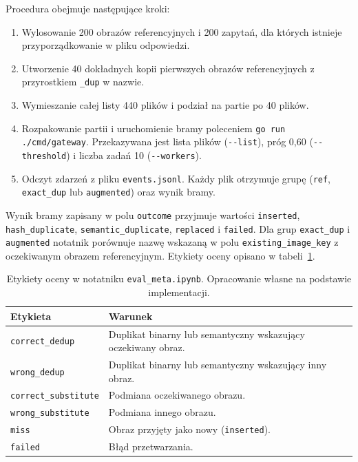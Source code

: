 Procedura obejmuje następujące kroki:

\begin{enumerate}
    \item Wylosowanie 200 obrazów referencyjnych i 200 zapytań,
    dla których istnieje przyporządkowanie w pliku odpowiedzi.
    \item Utworzenie 40 dokładnych kopii pierwszych obrazów
    referencyjnych z przyrostkiem \texttt{\_dup} w nazwie.
    \item Wymieszanie całej listy 440 plików i podział na partie
    po 40 plików.
    \item Rozpakowanie partii i uruchomienie bramy poleceniem
    \texttt{go run ./cmd/gateway}. Przekazywana jest lista plików
    (\texttt{-{}-list}), próg 0,60 (\texttt{-{}-threshold})
    i liczba zadań 10 (\texttt{-{}-workers}).
    \item Odczyt zdarzeń z pliku \texttt{events.jsonl}.
    Każdy plik otrzymuje grupę (\texttt{ref}, \texttt{exact\_dup}
    lub \texttt{augmented}) oraz wynik bramy.
\end{enumerate}

Wynik bramy zapisany w polu \texttt{outcome} przyjmuje wartości
\texttt{inserted}, \texttt{hash\_\allowbreak duplicate},
\texttt{semantic\_\allowbreak duplicate},
\texttt{replaced} i \texttt{failed}. Dla grup \texttt{exact\_dup}
i \texttt{augmented} notatnik porównuje nazwę wskazaną w polu
\texttt{existing\_image\_key} z oczekiwanym obrazem referencyjnym.
Etykiety oceny opisano w tabeli~\ref{tab:eval-meta-labels}.

\begin{table}[!htbp]
\centering
\caption{Etykiety oceny w notatniku \texttt{eval\_meta.ipynb}.
Opracowanie własne na podstawie implementacji.}
\label{tab:eval-meta-labels}
\begin{tabular}{|l|p{}|}
\hline
\textbf{Etykieta} & \textbf{Warunek} \\
\hline
\texttt{correct\_dedup} & Duplikat binarny lub semantyczny wskazujący
oczekiwany obraz. \\
\hline
\texttt{wrong\_dedup} & Duplikat binarny lub semantyczny wskazujący
inny obraz. \\
\hline
\texttt{correct\_substitute} & Podmiana oczekiwanego obrazu. \\
\hline
\texttt{wrong\_substitute} & Podmiana innego obrazu. \\
\hline
\texttt{miss} & Obraz przyjęty jako nowy (\texttt{inserted}). \\
\hline
\texttt{failed} & Błąd przetwarzania. \\
\hline
\end{tabular}
\end{table}

